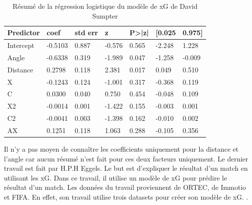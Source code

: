 \documentclass[12pt]{article}
\begin{document}
\begin{table}[htp]
    \centering
    \begin{tabular}{|l|l|l|l|l|l|l|}
    \hline
    \textbf{Predictor} & \textbf{coef} & \textbf{std err} & \textbf{z} & \textbf{P\textgreater{}|z|} & \textbf{{[}0.025} & \textbf{0.975{]}} \\ \hline
    Intercept          & -0.5103       & 0.887            & -0.576     & 0.565                       & -2.248            & 1.228             \\ \hline
    Angle              & -0.6338       & 0.319            & -1.989     & 0.047                       & -1.258            & -0.009            \\ \hline
    Distance           & 0.2798        & 0.118            & 2.381      & 0.017                       & 0.049             & 0.510             \\ \hline
    X                  & -0.1243       & 0.124            & -1.001     & 0.317                       & -0.368            & 0.119             \\ \hline
    C                  & 0.0300        & 0.040            & 0.750      & 0.454                       & -0.048            & 0.109             \\ \hline
    X2                 & -0.0014       & 0.001            & -1.422     & 0.155                       & -0.003            & 0.001             \\ \hline
    C2                 & -0.0041       & 0.003            & -1.398     & 0.162                       & -0.010            & 0.002             \\ \hline
    AX                 & 0.1251        & 0.118            & 1.063      & 0.288                       & -0.105            & 0.356             \\ \hline
    \end{tabular}
    \caption{Résumé de la régression logistique du modèle de xG de David Sumpter}
\end{table}
Il n'y a pas moyen de connaître les coefficients uniquement pour la distance et l'angle car aucun résumé n'est fait pour ces deux facteurs uniquement.
\newline\newline
Le dernier travail est fait par H.P.H Eggels. 
Le but est d'expliquer le résultat d'un match en utilisant les xG. 
Dans ce travail, il utilise un modèle de xG pour prédire le résultat d'un match.
Les données du travail proviennent de ORTEC, de Immotio et FIFA. En effet, son travail utilise trois datasets pour créer son modèle de xG. \cite{eggelsExpectedGoalsSoccer2016}.
\end{document}
